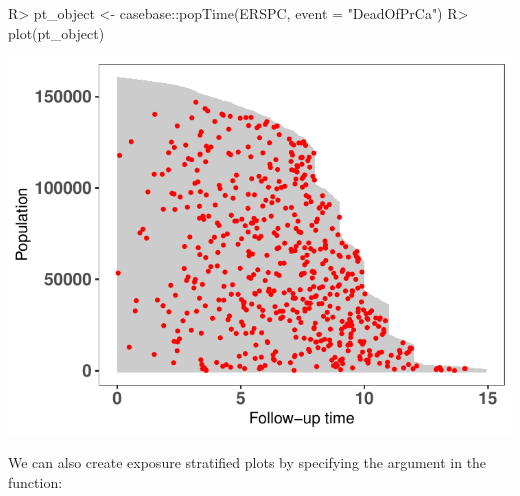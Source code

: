 \documentclass[
]{jss}
\begin{document}
\begin{CodeChunk}

\begin{CodeInput}
R> pt_object <- casebase::popTime(ERSPC, event = "DeadOfPrCa")
R> plot(pt_object)
\end{CodeInput}


\begin{center}\includegraphics{../figures/plot-erspc-data-1} \end{center}

\end{CodeChunk}

We can also create exposure stratified plots by specifying the
 argument in the  function:
\end{document}
